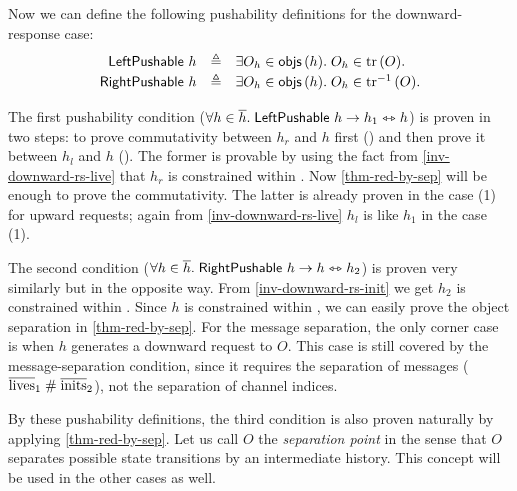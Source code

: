 Now we can define the following pushability definitions for the downward-response case:
\begin{displaymath}
  \renewcommand{\arraystretch}{1.2}
  \begin{array}{rcl}
    \mathsf{LeftPushable}\ h & \triangleq & \exists O_h \in \aobjs{h}.\; O_h \in \subtree{O}.\\
    \mathsf{RightPushable}\ h & \triangleq & \exists O_h \in \aobjs{h}.\; O_h \in \subtreec{O}.
  \end{array}
\end{displaymath}

The first pushability condition ($\forall h \in \overline{h}.\; \mathsf{LeftPushable}\ h \to h_1 \leftrightarrowtriangle h$) is proven in two steps: to prove commutativity between $h_r$ and $h$ first () and then prove it between $h_l$ and $h$ ().
The former is provable by using the fact from \autoref{inv-downward-rs-live} that $h_r$ is constrained within .
Now \autoref{thm-red-by-sep} will be enough to prove the commutativity.
The latter is already proven in the case (1) for upward requests; again from \autoref{inv-downward-rs-live} $h_l$ is like $h_1$ in the case (1).

The second condition ($\forall h \in \overline{h}.\; \mathsf{RightPushable}\ h \to h \leftrightarrowtriangle h_2$) is proven very similarly but in the opposite way.
From \autoref{inv-downward-rs-init} we get $h_2$ is constrained within .
Since $h$ is constrained within , we can easily prove the object separation in \autoref{thm-red-by-sep}.
For the message separation, the only corner case is when $h$ generates a downward request to $O$.
This case is still covered by the message-separation condition, since it requires the separation of messages ($\overline{\mathrm{lives}}_1 \; \# \; \overline{\mathrm{inits}}_2$), not the separation of channel indices.

By these pushability definitions, the third condition is also proven naturally by applying \autoref{thm-red-by-sep}.
Let us call $O$ the \emph{separation point} in the sense that $O$ separates possible state transitions by an intermediate history.
This concept will be used in the other cases as well.

